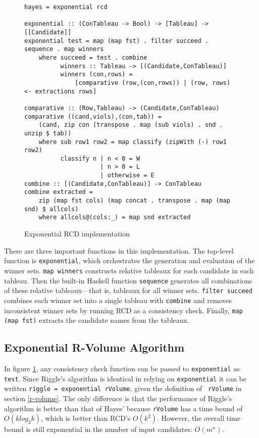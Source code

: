 \documentclass[11pt]{article}
\begin{document}
\begin{figure}
\centering
\begin{verbatim}
hayes = exponential rcd

exponential :: (ConTableau -> Bool) -> [Tableau] -> [[Candidate]]
exponential test = map (map fst) . filter succeed . sequence . map winners
    where succeed = test . combine
          winners :: Tableau -> [(Candidate,ConTableau)]
          winners (con,rows) =
              [comparative (row,(con,rows)) | (row, rows) <- extractions rows]

comparative :: (Row,Tableau) -> (Candidate,ConTableau)
comparative ((cand,viols),(con,tab)) =
    (cand, zip con (transpose . map (sub viols) . snd . unzip $ tab))
    where sub row1 row2 = map classify (zipWith (-) row1 row2)
          classify n | n < 0 = W
                     | n > 0 = L
                     | otherwise = E
combine :: [(Candidate,ConTableau)] -> ConTableau
combine extracted =
    zip (map fst cols) (map concat . transpose . map (map snd) $ allcols)
    where allcols@(cols:_) = map snd extracted
\end{verbatim}
  \caption{Exponential RCD implementation}
  \label{haskell-hayes}
\end{figure}

There are three important functions in this implementation. The
top-level function is {\tt exponential}, which orchestrates the
generation and evaluation of the winner sets. {\tt map winners}
constructs relative tableaux for each candidate in each tableau. Then
the built-in Haskell function {\tt sequence} generates all
combinations of these relative tableaux---that is, tableaux for all
winner sets. {\tt filter succeed} combines each winner set into a
single tableau with {\tt combine} and removes inconsistent winner sets
by running RCD as a consistency check. Finally, {\tt map (map fst)}
extracts the candidate names from the tableaux.

\subsection{Exponential R-Volume Algorithm}

In figure \ref{haskell-hayes}, any consistency check function can be passed to
{\tt exponential} as {\tt test}. Since Riggle's algorithm is
identical in relying on {\tt exponential} it can be written
\verb+riggle = exponential rVolume+, given the definition of {\tt
  rVolume} in section \ref{r-volume}. The only difference is that the
performance of Riggle's algorithm is better than that of
Hayes' because {\tt rVolume} has a time bound of $O(k log_2 k)$, which
is better than RCD's $O(k^2)$. However, the overall time bound is
still exponential in the number of input candidates: $O(m^n)$.
\end{document}
